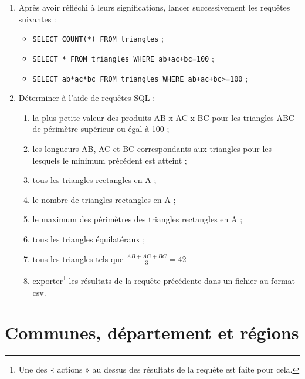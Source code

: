 \begin{enumerate}
 \item Après avoir réfléchi à leurs significations, lancer successivement les requêtes suivantes :
    \begin{itemize}
	\item[] \verb|SELECT COUNT(*) FROM triangles| ;
	\item[] \verb|SELECT * FROM triangles WHERE ab+ac+bc=100| ;
	\item[] \verb|SELECT ab*ac*bc FROM triangles WHERE ab+ac+bc>=100| ;
    \end{itemize}

 \item Déterminer à l'aide de requêtes SQL :
 
    \begin{enumerate}
      \item la plus petite valeur des produits AB x AC x BC pour les triangles ABC de périmètre supérieur ou égal à 100 ;
      \item les longueurs AB, AC et BC correspondants aux triangles pour les lesquels le minimum précédent est atteint ;
      \item tous les triangles rectangles en A ;
      \item le nombre de triangles rectangles en A ;
      \item le maximum des périmètres des triangles rectangles en A ;
      \item tous les triangles équilatéraux ;
      \item tous les triangles tels que $\frac{AB+AC+BC}{3} = 42$
      \item exporter\footnote{Une des « actions » au dessus des résultats de la requête est faite pour cela.} les résultats de la requête précédente dans un fichier au format csv.
    \end{enumerate}

\end{enumerate}

\section{Communes, département et régions}


